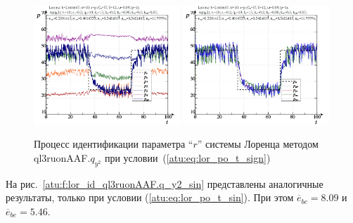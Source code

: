 \begin{figure}[ht!]
  \centerline{
    \includegraphics[width=0.49\textwidth]{p/cha/lor/ql3ruonAAF/lor_ql3ruonAAF_qy2-p_t_pi_sign.png}
    \hfill
    \includegraphics[width=0.49\textwidth]{p/cha/lor/ql3ruonAAF/lor_ql3ruonAAF_qy2-p_t_pz_sign.png}
  }
  \caption{Процесс идентификации параметра ``$r$'' системы Лоренца методом ql3ruonAAF.$q_{y^2}$ при условии~(\ref{atu:eq:lor_po_t_sign})}
  \label{atu:f:lor_id_ql3ruonAAF.q_y2_sign}
\end{figure}


На рис.~\ref{atu:f:lor_id_ql3ruonAAF.q_y2_sin} представлены аналогичные результаты,
только при условии (\ref{atu:eq:lor_po_t_sin}).
При этом
$\overline{e}_{bc}=8.09$
и
$\overline{e}_{be}=5.46$.


